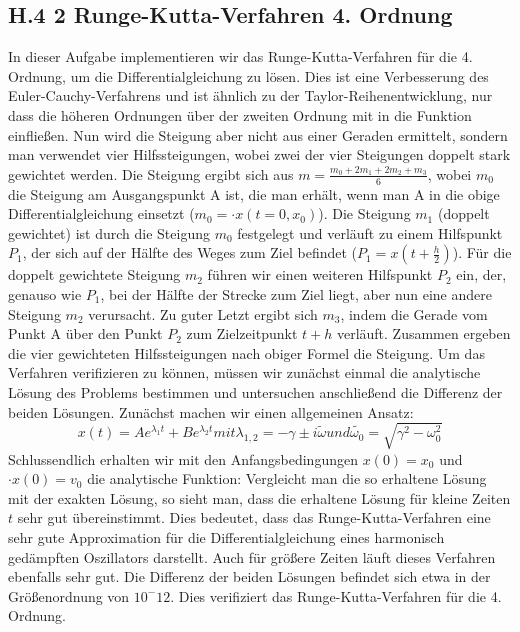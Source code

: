 \documentclass[ngerman]{scrartcl}
\begin{document}
\subsection{H.4 2 Runge-Kutta-Verfahren 4. Ordnung}
In dieser Aufgabe implementieren wir das Runge-Kutta-Verfahren für die 4. Ordnung, um die Differentialgleichung zu lösen. Dies ist eine Verbesserung des Euler-Cauchy-Verfahrens und ist ähnlich zu der Taylor-Reihenentwicklung, nur dass die höheren Ordnungen über der zweiten Ordnung mit in die Funktion einfließen. Nun wird die Steigung aber nicht aus einer Geraden ermittelt, sondern man verwendet vier Hilfssteigungen, wobei zwei der vier Steigungen doppelt stark gewichtet werden. Die Steigung ergibt sich aus $m=\frac{m_{0}+2 m_{1}+2 m_{2}+m_{3}}{6}$, wobei $m_{0}$ die Steigung am Ausgangspunkt A ist, die man erhält, wenn man A in die obige Differentialgleichung einsetzt ($m_{0}=\cdot{x}(t=0,x_{0})$). Die Steigung $m_{1}$ (doppelt gewichtet) ist durch die Steigung $m_{0}$ festgelegt und verläuft zu einem Hilfspunkt $P_{1}$, der sich auf der Hälfte des Weges zum Ziel befindet ($P_{1}=x(t+\frac{h}{2})$). Für die doppelt gewichtete Steigung $m_{2}$ führen wir einen weiteren Hilfspunkt $P_{2}$ ein, der, genauso wie $P_{1}$, bei der Hälfte der Strecke zum Ziel liegt, aber nun eine andere Steigung $m_{2}$ verursacht. Zu guter Letzt ergibt sich $m_{3}$, indem die Gerade vom Punkt A über den Punkt $P_{2}$ zum Zielzeitpunkt $t+h$ verläuft. Zusammen ergeben die vier gewichteten Hilfssteigungen nach obiger Formel die Steigung. Um das Verfahren verifizieren zu können, müssen wir zunächst einmal die analytische Lösung des Problems bestimmen und untersuchen anschließend die Differenz der beiden Lösungen. Zunächst machen wir einen allgemeinen Ansatz:
\begin{equation} x(t)=Ae^{\lambda_{1}t} + Be^{\lambda_{2}t} mit \lambda_{1,2}= - \gamma \pm i\tilde{\omega} und \tilde{\omega_0}=\sqrt{\gamma^2 - \omega^2_0} \end{equation}
Schlussendlich erhalten wir mit den Anfangsbedingungen $x(0)=x_0$ und $\cdot{x}(0)=v_0$ die analytische Funktion:
Vergleicht man die so erhaltene Lösung mit der exakten Lösung, so sieht man, dass die erhaltene Lösung für kleine Zeiten $t$ sehr gut übereinstimmt. Dies bedeutet, dass das Runge-Kutta-Verfahren eine sehr gute Approximation für die Differentialgleichung eines harmonisch gedämpften Oszillators darstellt. Auch für größere Zeiten läuft dieses Verfahren ebenfalls sehr gut. Die Differenz der beiden Lösungen befindet sich etwa in der Größenordnung von $10^-12$. Dies verifiziert das Runge-Kutta-Verfahren für die 4. Ordnung.
\end{document}
